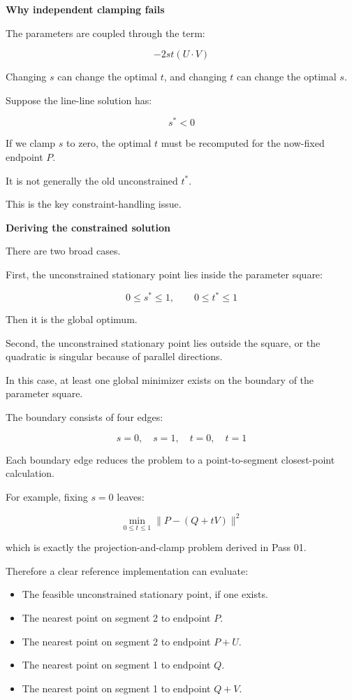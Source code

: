 \textbf{Why independent clamping fails}

The parameters are coupled through the term:

\[
-2st(U\cdot V)
\]

Changing \(s\) can change the optimal \(t\), and changing \(t\) can change the optimal \(s\).

Suppose the line-line solution has:

\[
s^*<0
\]

If we clamp \(s\) to zero, the optimal \(t\) must be recomputed for the now-fixed endpoint \(P\).

It is not generally the old unconstrained \(t^*\).

This is the key constraint-handling issue.

\textbf{Deriving the constrained solution}

There are two broad cases.

First, the unconstrained stationary point lies inside the parameter square:

\[
0\le s^*\le1,\qquad0\le t^*\le1
\]

Then it is the global optimum.

Second, the unconstrained stationary point lies outside the square, or the quadratic is singular because of parallel directions.

In this case, at least one global minimizer exists on the boundary of the parameter square.

The boundary consists of four edges:

\[
s=0,\quad s=1,\quad t=0,\quad t=1
\]

Each boundary edge reduces the problem to a point-to-segment closest-point calculation.

For example, fixing \(s=0\) leaves:

\[
\min_{0\le t\le1}\|P-(Q+tV)\|^2
\]

which is exactly the projection-and-clamp problem derived in Pass 01.

Therefore a clear reference implementation can evaluate:

\begin{itemize}
\tightlist
\item
  The feasible unconstrained stationary point, if one exists.
\item
  The nearest point on segment 2 to endpoint \(P\).
\item
  The nearest point on segment 2 to endpoint \(P+U\).
\item
  The nearest point on segment 1 to endpoint \(Q\).
\item
  The nearest point on segment 1 to endpoint \(Q+V\).
\end{itemize}

